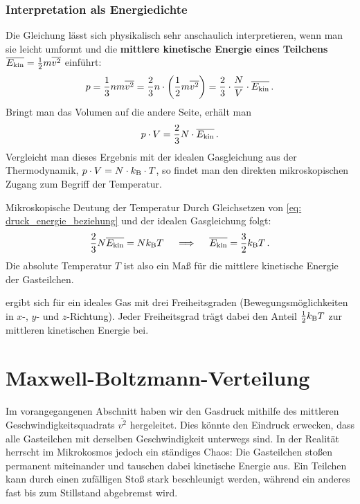 \subsubsection{Interpretation als Energiedichte}
Die Gleichung lässt sich physikalisch sehr anschaulich interpretieren, wenn man sie leicht umformt und die \textbf{mittlere kinetische Energie eines Teilchens} $\overline{E_{\mathrm{kin}}} = \frac{1}{2}m\overline{v^2}$ einführt:
\begin{equation}
    p = \frac{1}{3} n m \overline{v^2} = \frac{2}{3} n \cdot \left( \frac{1}{2} m \overline{v^2} \right) = \frac{2}{3} \cdot \frac{N}{V} \cdot \overline{E_{\mathrm{kin}}} \,.
\end{equation}
Bringt man das Volumen auf die andere Seite, erhält man
\begin{equation}\label{eq: druck_energie_beziehung}
    p \cdot V = \frac{2}{3} N \cdot \overline{E_{\mathrm{kin}}} \,.
\end{equation}
Vergleicht man dieses Ergebnis mit der idealen Gasgleichung aus der Thermodynamik, $p \cdot V = N \cdot k_{\mathrm{B}} \cdot T$, so findet man den direkten mikroskopischen Zugang zum Begriff der Temperatur.

\begin{rememberbox}{Mikroskopische Deutung der Temperatur}
    Durch Gleichsetzen von \cref{eq: druck_energie_beziehung} und der idealen Gasgleichung folgt:
    \begin{equation}\label{eq: Verbindung_EKin_mit_abs_T}
        \frac{2}{3} N \overline{E_{\mathrm{kin}}} = N k_{\mathrm{B}} T \quad \implies \quad \overline{E_{\mathrm{kin}}} = \frac{3}{2} k_{\mathrm{B}} T \,.
    \end{equation}
    Die absolute Temperatur $T$ ist also ein Maß für die mittlere kinetische Energie der Gasteilchen.
\end{rememberbox}
 ergibt sich für ein ideales Gas mit drei Freiheitsgraden (Bewegungsmöglichkeiten in $x$-, $y$- und $z$-Richtung). Jeder Freiheitsgrad trägt dabei den Anteil $\frac{1}{2} k_{\mathrm{B}} T$ zur mittleren kinetischen Energie bei. 

\section{Maxwell-Boltzmann-Verteilung}\label{sec: maxwell_boltzmann_verteilung}
Im vorangegangenen Abschnitt haben wir den Gasdruck mithilfe des mittleren Geschwindigkeitsquadrats $\overline{v^2}$ hergeleitet. Dies könnte den Eindruck erwecken, dass alle Gasteilchen mit derselben Geschwindigkeit unterwegs sind.
In der Realität herrscht im Mikrokosmos jedoch ein ständiges Chaos: Die Gasteilchen stoßen permanent miteinander und tauschen dabei kinetische Energie aus. Ein Teilchen kann durch einen zufälligen Stoß stark beschleunigt werden, während ein anderes fast bis zum Stillstand abgebremst wird.

